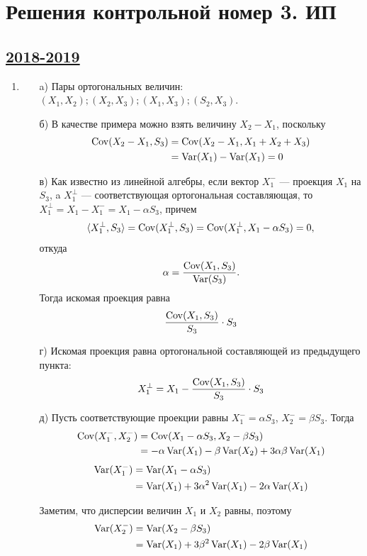 \thispagestyle{empty}
\section{Решения контрольной номер 3. ИП}




\subsection[2018-2019]{\hyperref[sec:kr_03_ip_2018_2019]{2018-2019}}
\label{sec:sol_kr_03_ip_2018_2019}

\begin{enumerate}
\item
\begin{enumerate}
\item[a)] Пары ортогональных величин: $(X_1,X_2); (X_2,X_3); (X_1,X_3); (S_2,X_3)$.
\item[б)] В качестве примера можно взять величину $X_2-X_1$, поскольку
\begin{align*}
\operatorname{Cov}(X_2-X_1,S_3) &= \operatorname{Cov}(X_2-X_1,X_1+X_2+X_3) \\
&= \operatorname{Var}(X_1)-\operatorname{Var}(X_1)=0
\end{align*}
\item[в)] Как известно из линейной алгебры, если вектор $X^-_1$ — проекция $X_1$ на $S_3$,
a $X^{\perp}_1$ — соответствующая ортогональная составляющая, то $X^{\perp}_1=X_1-X^-_1 = X_1-\alpha S_3$,
причем
\[
\langle X^{\perp}_1,S_3\rangle = \operatorname{Cov}(X^{\perp}_1,S_3) = \operatorname{Cov}(X^{\perp}_1,X_1-\alpha S_3) = 0,
\]
откуда
\[
\alpha = \frac{\operatorname{Cov}(X_1,S_3)}{\operatorname{Var}(S_3)}.
\]
Тогда искомая проекция равна
\[
\frac{\operatorname{Cov}(X_1,S_3)}{S_3}\cdot S_3
\]
\item[г)] Искомая проекция равна ортогональной составляющей из предыдущего пункта:
\[
X^{\perp}_1 = X_1 - \frac{\operatorname{Cov}(X_1,S_3)}{S_3}\cdot S_3
\]
\item[д)] Пусть соответствующие проекции равны $X^-_1 = \alpha S_3$, $X^-_2 = \beta S_3$.
Тогда
\begin{align*}
\operatorname{Cov}(X^-_1,X^-_2) &= \operatorname{Cov}(X_1-\alpha S_3,X_2 - \beta S_3) \\
&=-\alpha\operatorname{Var}(X_1)-\beta\operatorname{Var}(X_2)+3\alpha\beta\operatorname{Var}(X_1)
\end{align*}
\begin{align*}
\operatorname{Var}(X^-_1) &= \operatorname{Var}(X_1 - \alpha S_3)\\
&= \operatorname{Var}(X_1) + 3\alpha^2\operatorname{Var}(X_1) - 2\alpha\operatorname{Var}(X_1)
\end{align*}

Заметим, что дисперсии величин $X_1$ и $X_2$ равны, поэтому
\begin{align*}
\operatorname{Var}(X^-_2) &= \operatorname{Var}(X_2 - \beta S_3)\\
&= \operatorname{Var}(X_1) + 3\beta^2 \operatorname{Var}(X_1) - 2\beta\operatorname{Var}(X_1)
\end{align*}


\end{enumerate}
\end{enumerate}
